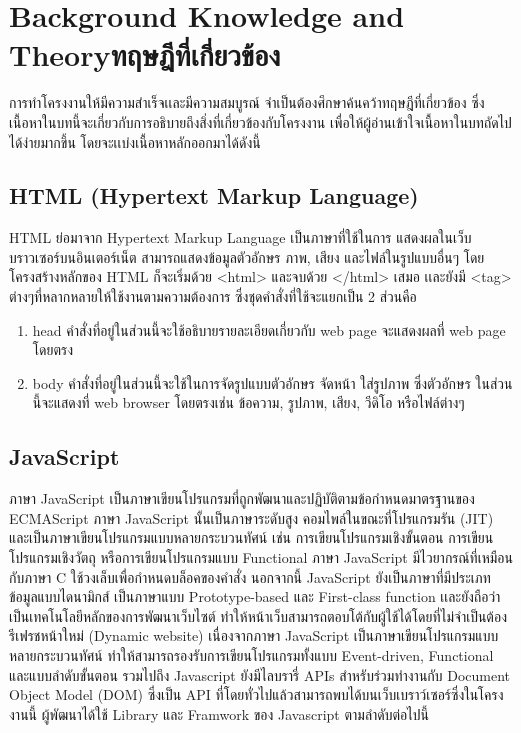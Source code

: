 \chapter{\ifenglish Background Knowledge and Theory\else ทฤษฎีที่เกี่ยวข้อง\fi}

การทําโครงงานให้มีความสําเร็จเเละมีความสมบูรณ์ จําเป็นต้องศึกษาค้นคว้าทฤษฎีที่เกี่ยวข้อง ซึ่งเนื้อหาในบทนี้จะเกี่ยวกับการอธิบายถึงสิ่งที่เกี่ยวข้องกับโครงงาน เพื่อให้ผู้อ่านเข้าใจเนื้อหาในบทถัดไปได้ง่ายมากขึ้น โดยจะเเบ่งเนื้อหาหลักออกมาได้ดังนี้


\section{HTML (Hypertext Markup Language)}

{HTML ย่อมาจาก Hypertext Markup Language เป็นภาษาที่ใช้ในการ  แสดงผลในเว็บบราวเซอร์บนอินเตอร์เน็ต สามารถแสดงข้อมูลตัวอักษร ภาพ, เสียง และไฟล์ในรูปแบบอื่นๆ โดยโครงสร้างหลักของ HTML ก็จะเริ่มด้วย <html> และจบด้วย </html> เสมอ เเละยังมี <tag> ต่างๆที่หลากหลายให้ใช้งานตามความต้องการ ซึ่งชุดคำสั่งที่ใช้จะแยกเป็น 2 ส่วนคือ}

\begin{enumerate}
  \item head คำสั่งที่อยู่ในส่วนนี้จะใช้อธิบายรายละเอียดเกี่ยวกับ web page จะแสดงผลที่ web page โดยตรง 
  \item body คำสั่งที่อยู่ในส่วนนี้จะใช้ในการจัดรูปแบบตัวอักษร จัดหน้า ใส่รูปภาพ ซึ่งตัวอักษร ในส่วนนี้จะแสดงที่ web browser โดยตรงเช่น ข้อความ, รูปภาพ, เสียง, วีดิโอ หรือไฟล์ต่างๆ
  
\end{enumerate}

\section{JavaScript}

ภาษา JavaScript เป็นภาษาเขียนโปรแกรมที่ถูกพัฒนาและปฏิบัติตามข้อกำหนดมาตรฐานของ ECMAScript ภาษา JavaScript นั้นเป็นภาษาระดับสูง คอมไพล์ในขณะที่โปรแกรมรัน (JIT) และเป็นภาษาเขียนโปรแกรมแบบหลายกระบวนทัศน์ เช่น การเขียนโปรแกรมเชิงขั้นตอน การเขียนโปรแกรมเชิงวัตถุ หรือการเขียนโปรแกรมแบบ Functional ภาษา JavaScript มีไวยากรณ์ที่เหมือนกับภาษา C ใช้วงเล็บเพื่อกำหนดบล็อคของคำสั่ง นอกจากนี้ JavaScript ยังเป็นภาษาที่มีประเภทข้อมูลแบบไดนามิกส์ เป็นภาษาแบบ Prototype-based และ First-class function เเละยังถือว่าเป็นเทคโนโลยีหลักของการพัฒนาเว็บไซต์ ทำให้หน้าเว็บสามารถตอบโต้กับผู้ใช้ได้โดยที่ไม่จำเป็นต้องรีเฟรชหน้าใหม่ (Dynamic website) เนื่องจากภาษา JavaScript เป็นภาษาเขียนโปรแกรมแบบหลายกระบวนทัศน์ ทำให้สามารถรองรับการเขียนโปรแกรมทั้งแบบ Event-driven, Functional และแบบลำดับขั้นตอน รวมไปถึง Javascript ยังมีไลบรารี่ APIs สำหรับร่วมทำงานกับ Document Object Model (DOM) ซึ่งเป็น API ที่โดยทั่วไปแล้วสามารถพบได้บนเว็บเบราว์เซอร์ซึ่งในโครงงานนี้ ผู้พัฒนาได้ใช้ Library และ Framwork ของ Javascript ตามลำดับต่อไปนี้ 


